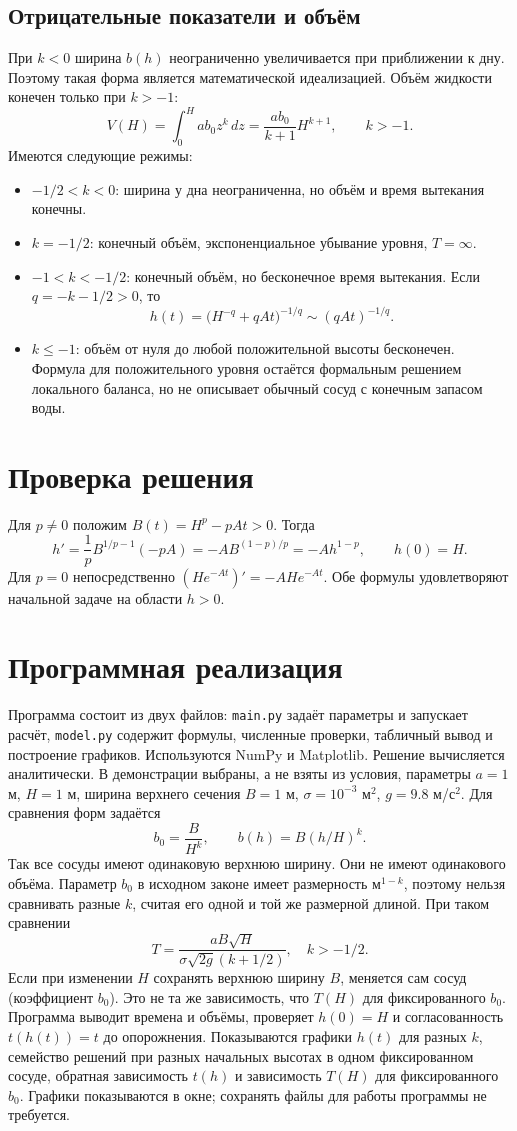 ﻿\documentclass[12pt,a4paper]{article}
\begin{document}
\subsection{Отрицательные показатели и объём}
При $k<0$ ширина $b(h)$ неограниченно увеличивается при приближении к дну. Поэтому такая форма является математической идеализацией.
Объём жидкости конечен только при $k>-1$:
\[
V(H)=\int_0^H ab_0z^k\,dz=\frac{ab_0}{k+1}H^{k+1},\qquad k>-1.
\]
Имеются следующие режимы:
\begin{itemize}
\item $-1/2<k<0$: ширина у дна неограниченна, но объём и время вытекания конечны.
\item $k=-1/2$: конечный объём, экспоненциальное убывание уровня, $T=\infty$.
\item $-1<k<-1/2$: конечный объём, но бесконечное время вытекания. Если $q=-k-1/2>0$, то
\[
h(t)=\bigl(H^{-q}+qAt\bigr)^{-1/q}\sim(qAt)^{-1/q}.
\]
\item $k\le-1$: объём от нуля до любой положительной высоты бесконечен. Формула для положительного уровня остаётся формальным решением локального баланса, но не описывает обычный сосуд с конечным запасом воды.
\end{itemize}

\section{Проверка решения}
Для $p\ne0$ положим $B(t)=H^p-pAt>0$. Тогда
\[
h'=\frac1pB^{1/p-1}(-pA)=-AB^{(1-p)/p}=-Ah^{1-p},\qquad h(0)=H.
\]
Для $p=0$ непосредственно $(He^{-At})'=-AHe^{-At}$. Обе формулы удовлетворяют начальной задаче на области $h>0$.

\section{Программная реализация}
Программа состоит из двух файлов: \texttt{main.py} задаёт параметры и запускает расчёт, \texttt{model.py} содержит формулы, численные проверки, табличный вывод и построение графиков. Используются NumPy и Matplotlib. Решение вычисляется аналитически.
В демонстрации выбраны, а не взяты из условия, параметры $a=1$ м, $H=1$ м, ширина верхнего сечения $B=1$ м, $\sigma=10^{-3}$ м$^2$, $g=9.8$ м/с$^2$. Для сравнения форм задаётся
\[
b_0=\frac{B}{H^k},\qquad b(h)=B(h/H)^k.
\]
Так все сосуды имеют одинаковую верхнюю ширину. Они не имеют одинакового объёма. Параметр $b_0$ в исходном законе имеет размерность $\text{м}^{1-k}$, поэтому нельзя сравнивать разные $k$, считая его одной и той же размерной длиной.
При таком сравнении
\[
T=\frac{aB\sqrt H}{\sigma\sqrt{2g}(k+1/2)},\quad k>-1/2.
\]
Если при изменении $H$ сохранять верхнюю ширину $B$, меняется сам сосуд (коэффициент $b_0$). Это не та же зависимость, что $T(H)$ для фиксированного $b_0$.
Программа выводит времена и объёмы, проверяет $h(0)=H$ и согласованность $t(h(t))=t$ до опорожнения. Показываются графики $h(t)$ для разных $k$, семейство решений при разных начальных высотах в одном фиксированном сосуде, обратная зависимость $t(h)$ и зависимость $T(H)$ для фиксированного $b_0$. Графики показываются в окне; сохранять файлы для работы программы не требуется.
\end{document}
